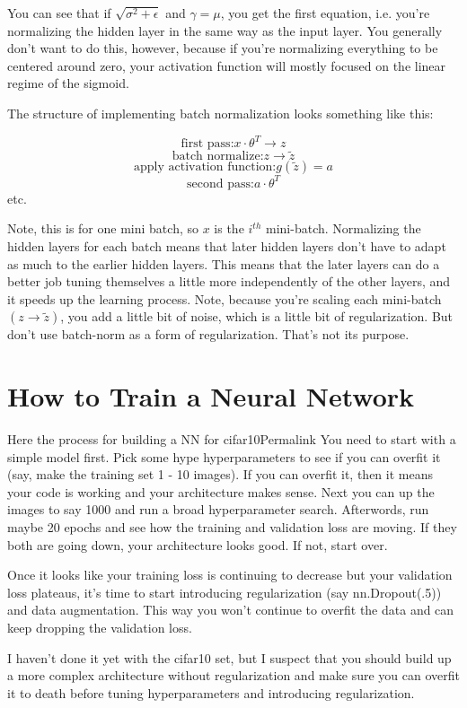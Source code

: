 You can see that if $\sqrt{\sigma^2 + \epsilon}$ and $\gamma = \mu$, you get the first equation, i.e. you're normalizing the hidden layer in the same way as the input layer. You generally don't want to do this, however, because if you're normalizing everything to be centered around zero, your activation function will mostly focused on the linear regime of the sigmoid.

The structure of implementing batch normalization looks something like this:

$$\text{first pass:} x \cdot \theta^T \rightarrow z$$
$$\text{batch normalize:} z \rightarrow \widetilde{z}$$ 
$$\text{apply activation function:} g(\widetilde{z}) = a$$
$$\text{second pass:} a \cdot \theta^T$$     
etc.

Note, this is for one mini batch, so $x$ is the $i^{th}$ mini-batch. Normalizing the hidden layers for each batch means that later hidden layers don't have to adapt as much to the earlier hidden layers. This means that the later layers can do a better job tuning themselves a little more independently of the other layers, and it speeds up the learning process. Note, because you're scaling each mini-batch $(z \rightarrow \widetilde{z})$, you add a little bit of noise, which is a little bit of regularization. But don't use batch-norm as a form of regularization. That's not its purpose.

\section{How to Train a Neural Network}
Here the process for building a NN for cifar10Permalink
You need to start with a simple model first. Pick some hype hyperparameters to see if you can overfit it (say, make the training set 1 - 10 images). If you can overfit it, then it means your code is working and your architecture makes sense. Next you can up the images to say 1000 and run a broad hyperparameter search. Afterwords, run maybe 20 epochs and see how the training and validation loss are moving. If they both are going down, your architecture looks good. If not, start over.

Once it looks like your training loss is continuing to decrease but your validation loss plateaus, it’s time to start introducing regularization (say nn.Dropout(.5)) and data augmentation. This way you won’t continue to overfit the data and can keep dropping the validation loss.

I haven’t done it yet with the cifar10 set, but I suspect that you should build up a more complex architecture without regularization and make sure you can overfit it to death before tuning hyperparameters and introducing regularization.

